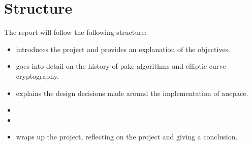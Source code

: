 \section{Structure}
The report will follow the following structure:
\begin{itemize}
    \item{ introduces the project and provides an explanation of the objectives.}
    \item{ goes into detail on the history of \gls{pake} algorithms and elliptic curve cryptography.}
    \item{ explains the design decisions made around the implementation of \gls{aucpace}.}
    \item{}
    \item{}
    \item{ wraps up the project, reflecting on the project and giving a conclusion.}
\end{itemize}
